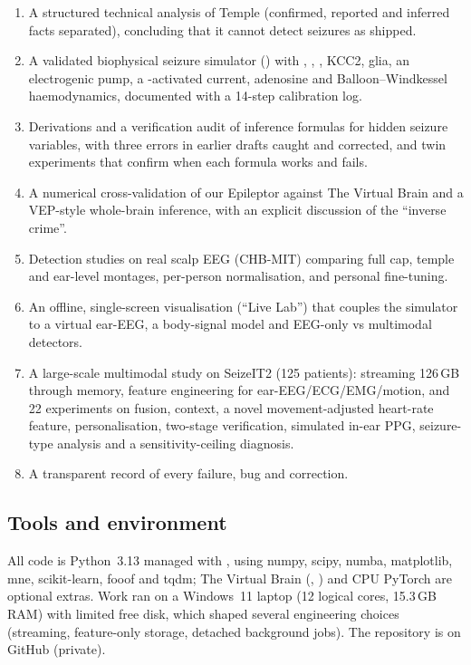 \begin{enumerate}
\item A structured technical analysis of Temple (confirmed, reported and inferred facts separated), concluding that it cannot detect seizures as shipped.
\item A validated biophysical seizure simulator () with \Kp, \Nap, \Clm, KCC2, glia, an electrogenic pump, a \Nap-activated \Kp{} current, adenosine and Balloon--Windkessel haemodynamics, documented with a 14-step calibration log.
\item Derivations and a verification audit of inference formulas for hidden seizure variables, with three errors in earlier drafts caught and corrected, and twin experiments that confirm when each formula works and fails.
\item A numerical cross-validation of our Epileptor against The Virtual Brain and a VEP-style whole-brain inference, with an explicit discussion of the ``inverse crime''.
\item Detection studies on real scalp EEG (CHB-MIT) comparing full cap, temple and ear-level montages, per-person normalisation, and personal fine-tuning.
\item An offline, single-screen visualisation (``Live Lab'') that couples the simulator to a virtual ear-EEG, a body-signal model and EEG-only vs multimodal detectors.
\item A large-scale multimodal study on SeizeIT2 (125 patients): streaming 126\,GB through memory, feature engineering for ear-EEG/ECG/EMG/motion, and 22 experiments on fusion, context, a novel movement-adjusted heart-rate feature, personalisation, two-stage verification, simulated in-ear PPG, seizure-type analysis and a sensitivity-ceiling diagnosis.
\item A transparent record of every failure, bug and correction.
\end{enumerate}

\subsection{Tools and environment}

All code is Python~3.13 managed with , using numpy, scipy, numba, matplotlib, mne, scikit-learn, fooof and tqdm; The Virtual Brain (, ) and CPU PyTorch are optional extras. Work ran on a Windows~11 laptop (12 logical cores, 15.3\,GB RAM) with limited free disk, which shaped several engineering choices (streaming, feature-only storage, detached background jobs). The repository is  on GitHub (private).
